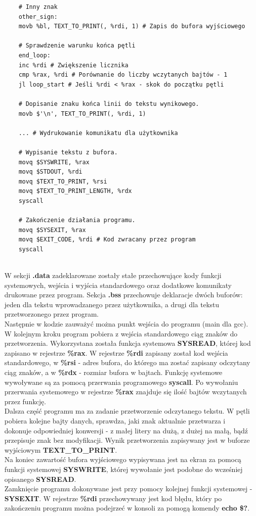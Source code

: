 \documentclass[a4paper,12pt]{article}
\begin{document}
\begin{verbatim}
	# Inny znak
	other_sign:
	movb %bl, TEXT_TO_PRINT(, %rdi, 1) # Zapis do bufora wyjściowego
	
	# Sprawdzenie warunku końca pętli
	end_loop:
	inc %rdi # Zwiększenie licznika
	cmp %rax, %rdi # Porównanie do liczby wczytanych bajtów - 1
	jl loop_start # Jeśli %rdi < %rax - skok do początku pętli
	
	# Dopisanie znaku końca linii do tekstu wynikowego.
	movb $'\n', TEXT_TO_PRINT(, %rdi, 1)
	
	... # Wydrukowanie komunikatu dla użytkownika
	
	# Wypisanie tekstu z bufora.
	movq $SYSWRITE, %rax
	movq $STDOUT, %rdi
	movq $TEXT_TO_PRINT, %rsi
	movq $TEXT_TO_PRINT_LENGTH, %rdx
	syscall
	
	# Zakończenie działania programu.
	movq $SYSEXIT, %rax 
	movq $EXIT_CODE, %rdi # Kod zwracany przez program
	syscall
	
\end{verbatim}
W sekcji \textbf{.data} zadeklarowane zostały stałe przechowujące kody funkcji systemowych, wejścia i wyjścia standardowego oraz dodatkowe komunikaty drukowane przez program. Sekcja \textbf{.bss} przechowuje deklaracje dwóch buforów: jeden dla tekstu wprowadzanego przez użytkownika, a drugi dla tekstu przetworzonego przez program.\\
Następnie w kodzie zauważyć można punkt wejścia do programu (main dla gcc). W kolejnym kroku program pobiera z wejścia standardowego ciąg znaków do przetworzenia. Wykorzystana została funkcja systemowa \textbf{SYSREAD}, której kod zapisano w rejestrze \textbf{\%rax}. W rejestrze \textbf{\%rdi} zapisany został kod wejścia standardowego, w \textbf{\%rsi} - adres bufora, do którego ma zostać zapisany odczytany ciąg znaków, a w \textbf{\%rdx} - rozmiar bufora w bajtach. Funkcję systemowe wywoływane są za pomocą przerwania programowego \textbf{syscall}. Po wywołaniu przerwania systemowego w rejestrze \textbf{\%rax} znajduje się ilość bajtów wczytanych przez funkcję.\\
Dalsza część programu ma za zadanie przetworzenie odczytanego tekstu. W pętli pobiera kolejne bajty danych, sprawdza, jaki znak aktualnie przetwarza i dokonuje odpowiedniej konwersji - z małej litery na dużą, z dużej na małą, bądź przepisuje znak bez modyfikacji. Wynik przetworzenia zapisywany jest w buforze wyjściowym \textbf{TEXT\_TO\_PRINT}.\\
Na koniec zawartość bufora wyjściowego wypisywana jest na ekran za pomocą funkcji systemowej \textbf{SYSWRITE}, której wywołanie jest podobne do wcześniej opisanego \textbf{SYSREAD}.\\
Zamknięcie programu dokonywane jest przy pomocy kolejnej funkcji systemowej - \textbf{SYSEXIT}. W rejestrze \textbf{\%rdi} przechowywany jest kod błędu, który po zakończeniu programu można podejrzeć w konsoli za pomogą komendy \textbf{echo \$?}.
\end{document}

